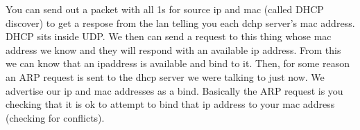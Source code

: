 \documentclass[12pt]{article}
\begin{document}
  
  
You can send out a packet with all 1s for source ip and mac (called DHCP discover) to get a respose from the lan telling you each dchp server's mac address. DHCP sits inside UDP. We then can send a request to this thing whose mac address we know and they will respond with an available ip address. From this we can know that an ipaddress is available and bind to it. Then, for some reason an ARP request is sent to the dhcp server we were talking to just now. We advertise our ip and mac addresses as a bind. Basically the ARP request is you checking that it is ok to attempt to bind that ip address to your mac address (checking for conflicts). 
\end{document}
